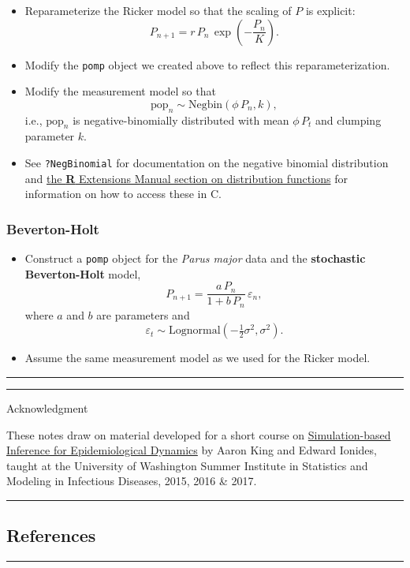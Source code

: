\documentclass[]{article}
\begin{document}
\begin{itemize}
\item
  Reparameterize the Ricker model so that the scaling of \(P\) is
  explicit: \[P_{n+1} = r\,P_{n}\,\exp\left(-\frac{P_{n}}{K}\right).\]
\item
  Modify the \texttt{pomp} object we created above to reflect this
  reparameterization.
\item
  Modify the measurement model so that
  \[\mathrm{pop}_n \sim \mathrm{Negbin}(\phi\,P_n,k),\] i.e.,
  \(\mathrm{pop}_n\) is negative-binomially distributed with mean
  \(\phi\,P_t\) and clumping parameter \(k\).
\item
  See \texttt{?NegBinomial} for documentation on the negative binomial
  distribution and
  \href{http://cran.r-project.org/doc/manuals/r-release/R-exts.html\#Distribution-functions}{the
  \textbf{R} Extensions Manual section on distribution functions} for
  information on how to access these in C.
\end{itemize}

\subsubsection{Beverton-Holt}\label{beverton-holt}

\begin{itemize}
\item
  Construct a \texttt{pomp} object for the \emph{Parus major} data and
  the \textbf{stochastic Beverton-Holt} model,
  \[P_{n+1} = \frac{a\,P_n}{1+b\,P_n}\,\varepsilon_n,\] where \(a\) and
  \(b\) are parameters and
  \[\varepsilon_t \sim \mathrm{Lognormal}(-\tfrac{1}{2}\sigma^2,\sigma^2).\]
\item
  Assume the same measurement model as we used for the Ricker model.
\end{itemize}

\begin{center}\rule{0.5\linewidth}{\linethickness}\end{center}

\begin{center}\rule{0.5\linewidth}{\linethickness}\end{center}

Acknowledgment

These notes draw on material developed for a short course on
\href{http://kingaa.github.io/sbied/}{Simulation-based Inference for
Epidemiological Dynamics} by Aaron King and Edward Ionides, taught at
the University of Washington Summer Institute in Statistics and Modeling
in Infectious Diseases, 2015, 2016 \& 2017.

\begin{center}\rule{0.5\linewidth}{\linethickness}\end{center}

\subsection{References}\label{references}

\begin{center}\rule{0.5\linewidth}{\linethickness}\end{center}
\end{document}
